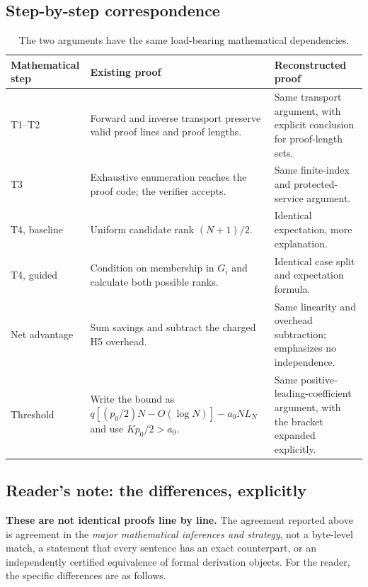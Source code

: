 \documentclass[11pt,letterpaper]{article}
\begin{document}
\subsection{Step-by-step correspondence}
\begin{table}[htbp]
\centering
\renewcommand{\arraystretch}{1.22}
\begin{tabularx}{\linewidth}{@{}p{1.12in}XX@{}}
\toprule
Mathematical step & Existing proof & Reconstructed proof\\
\midrule
T1--T2 & Forward and inverse transport preserve valid proof lines and proof lengths. & Same transport argument, with explicit conclusion for proof-length sets.\\
T3 & Exhaustive enumeration reaches the proof code; the verifier accepts. & Same finite-index and protected-service argument.\\
T4, baseline & Uniform candidate rank $(N+1)/2$. & Identical expectation, more explanation.\\
T4, guided & Condition on membership in $G_i$ and calculate both possible ranks. & Identical case split and expectation formula.\\
Net advantage & Sum savings and subtract the charged H5 overhead. & Same linearity and overhead subtraction; emphasizes no independence.\\
Threshold & Write the bound as $q[(p_0/2)N-O(\log N)]-a_0NL_N$ and use $Kp_0/2>a_0$. & Same positive-leading-coefficient argument, with the bracket expanded explicitly.\\
\bottomrule
\end{tabularx}
\caption{The two arguments have the same load-bearing mathematical dependencies.}
\end{table}

\subsection{Reader's note: the differences, explicitly}
\noindent\textbf{These are not identical proofs line by line.} The agreement reported
above is agreement in the \emph{major mathematical inferences and strategy}, not a
byte-level match, a statement that every sentence has an exact counterpart, or an
independently certified equivalence of formal derivation objects. For the reader,
the specific differences are as follows.
\end{document}
